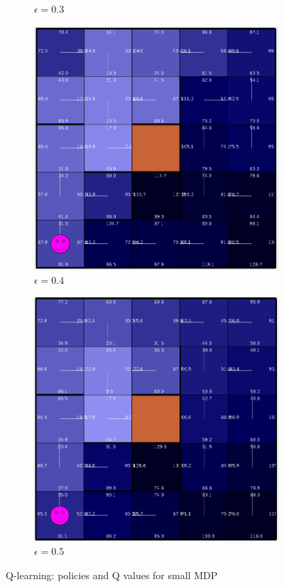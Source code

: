 \documentclass[letterpaper]{article}
\begin{document}
\begin{figure}
\begin{subfigure}{.3\textwidth}
			\caption{$\epsilon = 0.3$}		
		\end{subfigure}
		\begin{subfigure}{.3\textwidth}
			\centering
			\includegraphics[width=\linewidth]{images/small_ql_04}
			\caption{$\epsilon = 0.4$}		
		\end{subfigure}
		\begin{subfigure}{.3\textwidth}
			\centering
			\includegraphics[width=\linewidth]{images/small_ql_05}
			\caption{$\epsilon = 0.5$}		
		\end{subfigure}
		\caption{Q-learning: policies and Q values for small MDP}
		\label{fig:mdp-ql-small}%
	\end{figure}%
\end{document}
